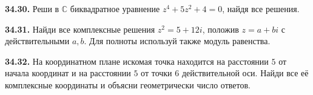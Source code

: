 \noindent\begin{minipage}[t]{\linewidth}\textbf{34.30.}\starmark{} Реши в \(\mathbb C\) биквадратное уравнение \(z^4+5z^2+4=0\), найдя все решения.\par\end{minipage}\par
\noindent\begin{minipage}[t]{\linewidth}\textbf{34.31.}\starmark{} Найди все комплексные решения \(z^2=5+12i\), положив \(z=a+bi\) с действительными \(a,b\). Для полноты используй также модуль равенства.\par\end{minipage}\par
\noindent\begin{minipage}[t]{\linewidth}\textbf{34.32.}\starmark{} На координатном плане искомая точка находится на расстоянии \(5\) от начала координат и на расстоянии \(5\) от точки \(6\) действительной оси. Найди все её комплексные координаты и объясни геометрически число ответов.\par\end{minipage}\par
\endgroup
